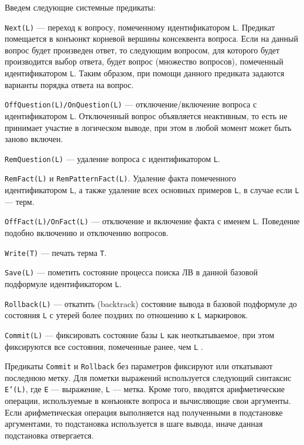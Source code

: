 Введем следующие системные предикаты:
\begin{description}

\item{\texttt{Next(L)}} --- переход к вопросу, помеченному идентификатором \texttt{L}. Предикат помещается в конъюнкт корневой вершины консеквента вопроса.  Если на данный вопрос будет произведен ответ, то следующим вопросом, для которого будет производится выбор ответа, будет вопрос (множество вопросов), помеченный идентификатором \texttt{L}. Таким образом, при помощи данного предиката задаются варианты порядка ответа на вопрос.

\item{\texttt{OffQuestion(L)/OnQuestion(L)}} --- отключение/включение вопроса с идентификатором \texttt{L}. Отключенный вопрос объявляется неактивным, то есть не принимает участие в логическом выводе, при этом в любой момент может быть заново включен.

\item{\texttt{RemQuestion(L)}} --- удаление вопроса с идентификатором \texttt{L}.

\item{\texttt{RemFact(L)} и \texttt{RemPatternFact(L)}}. Удаление факта помеченного идентификатором \texttt{L}, а также удаление всех основных примеров \texttt{L}, в случае если \texttt{L} --– терм.

\item{\texttt{OffFact(L)/OnFact(L)}} --- отключение и включение факта с именем \texttt{L}. Поведение подобно включению и отключению вопросов.

\item{\texttt{Write(T)}} --- печать терма \texttt{T}.

\item{\texttt{Save(L)}} --- пометить состояние процесса поиска ЛВ в данной базовой подформуле идентификатором \texttt{L}.

\item{\texttt{Rollback(L)}} --- откатить (backtrack) состояние вывода в базовой подформуле до состояния \texttt{L} с утерей более поздних по отношению к \texttt{L} маркировок.

\item{\texttt{Commit(L)}} --- фиксировать состояние базы \texttt{L} как неоткатываемое, при этом фиксируются все состояния, помеченные ранее, чем \texttt{L} .
\end{description}
Предикаты \texttt{Commit} и \texttt{Rollback} без параметров фиксируют или откатывают последнюю метку. Для пометки выражений используется следующий синтаксис \texttt{E'(L)}, где \texttt{E} --– выражение, \texttt{L} --– метка. Кроме того, вводятся арифметические операции, используемые в конъюнкте вопроса и вычисляющие свои аргументы. Если арифметическая операция выполняется над полученными в подстановке аргументами, то подстановка используется в шаге вывода, иначе данная подстановка отвергается.

